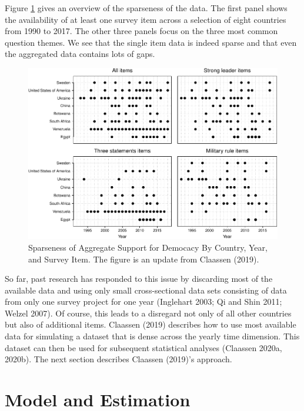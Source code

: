 \documentclass[12pt,english,a4paper,oneside]{article}
\theoremstyle{definition}
\theoremstyle{definition}
\theoremstyle{definition}
\theoremstyle{definition}
\theoremstyle{remark}
\begin{document}
Figure \ref{fig:sparse-data} gives an overview of the sparseness of the data. The first panel shows the availability of at least one survey item across a selection of eight countries from 1990 to 2017. The other three panels focus on the three most common question themes. We see that the single item data is indeed sparse and that even the aggregated data contains lots of gaps.

\begin{figure}[H]
\includegraphics[width=\textwidth]{figs/sparse-data-1} \caption[Sparseness of Aggregate Support for Democacy By Country, Year, and Survey Item]{Sparseness of Aggregate Support for Democacy By Country, Year, and Survey Item. The figure is an update from Claassen (2019).}\label{fig:sparse-data}
\end{figure}

\noindent
So far, past research has responded to this issue by discarding most of the available data and using only small cross-sectional data sets consisting of data from only one survey project for one year (Inglehart 2003; Qi and Shin 2011; Welzel 2007). Of course, this leads to a disregard not only of all other countries but also of additional items. Claassen (2019) describes how to use most available data for simulating a dataset that is dense across the yearly time dimension. This dataset can then be used for subsequent statistical analyses (Claassen 2020a, 2020b). The next section describes Claassen (2019)'s approach.

\hypertarget{model-and-estimation}{%
\section{Model and Estimation}\label{model-and-estimation}}
\end{document}
